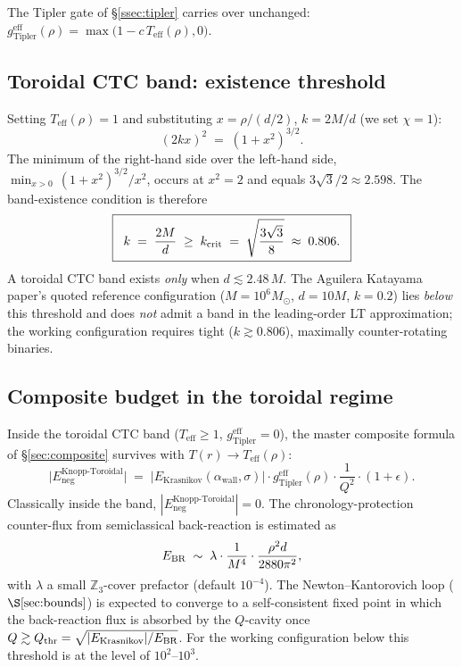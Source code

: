 \documentclass[11pt,a4paper]{article}
\begin{document}
The Tipler gate of \S\ref{ssec:tipler} carries over unchanged:
$g_{\mathrm{Tipler}}^{\mathrm{eff}}(\rho)=\max\bigl(1-c\,T_{\mathrm{eff}}(\rho),0\bigr)$.

\subsection{Toroidal CTC band: existence threshold}

Setting $T_{\mathrm{eff}}(\rho)=1$ and substituting $x=\rho/(d/2)$, $k=2M/d$ (we set $\chi=1$):
\begin{equation}
(2kx)^{2}\;=\;(1+x^{2})^{3/2}.
\end{equation}
The minimum of the right-hand side over the left-hand side, $\min_{x>0}\,(1+x^{2})^{3/2}/x^{2}$, occurs at $x^{2}=2$ and equals $3\sqrt{3}/2 \approx 2.598$. The band-existence condition is therefore
\begin{equation}\boxed{\;\;k \;=\; \frac{2M}{d} \;\geq\; k_{\rm crit} \;=\; \sqrt{\frac{3\sqrt{3}}{8}} \;\approx\; 0.806.\;\;}\end{equation}
A toroidal CTC band exists \emph{only} when $d\lesssim 2.48\,M$. The Aguilera Katayama paper's quoted reference configuration ($M=10^{6}M_{\odot}$, $d=10M$, $k=0.2$) lies \emph{below} this threshold and does \emph{not} admit a band in the leading-order LT approximation; the working configuration requires tight ($k\gtrsim 0.806$), maximally counter-rotating binaries.

\subsection{Composite budget in the toroidal regime}

Inside the toroidal CTC band ($T_{\mathrm{eff}}\geq 1$, $g_{\mathrm{Tipler}}^{\mathrm{eff}}=0$), the master composite formula of \S\ref{sec:composite} survives with $T(r)\to T_{\mathrm{eff}}(\rho)$:
\begin{equation}\label{eq:E_toroidal}
\bigl|E_{\mathrm{neg}}^{\mathrm{Knopp\text{-}Toroidal}}\bigr| \;=\;
\bigl|E_{\mathrm{Krasnikov}}(\alpha_{\mathrm{wall}},\sigma)\bigr|
\cdot g_{\mathrm{Tipler}}^{\mathrm{eff}}(\rho)
\cdot \frac{1}{Q^{2}}
\cdot (1+\epsilon).
\end{equation}
Classically inside the band, $|E_{\mathrm{neg}}^{\mathrm{Knopp\text{-}Toroidal}}|=0$. The chronology-protection counter-flux from semiclassical back-reaction is estimated as
\begin{equation}
E_{\rm BR}\;\sim\;\lambda \cdot \frac{1}{M^{4}}\cdot\frac{\rho^{2}d}{2880\pi^{2}},
\end{equation}
with $\lambda$ a small $\mathbb{Z}_{3}$-cover prefactor (default $10^{-4}$). The Newton--Kantorovich loop ($\S\ref{sec:bounds}$) is expected to converge to a self-consistent fixed point in which the back-reaction flux is absorbed by the $Q$-cavity once $Q\gtrsim Q_{\rm thr}=\sqrt{|E_{\mathrm{Krasnikov}}|/E_{\rm BR}}$. For the working configuration below this threshold is at the level of $10^{2}$--$10^{3}$.
\end{document}
